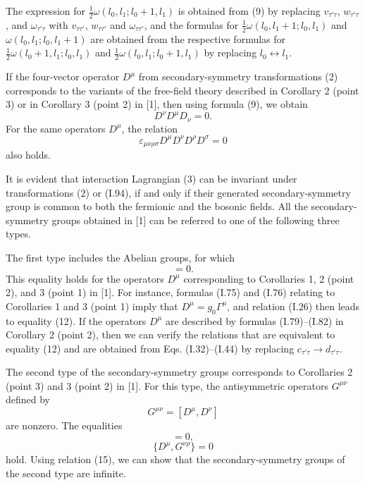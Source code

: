\documentclass[a4paper,12pt]{article}
\begin{document}
The expression for $\frac{1}{2} \omega (l_{0},l_{1};l_{0}+1,l_{1})$ is obtained
from (9) by replacing $v_{\tau' \tau}$, $w_{\tau' \tau}$, and 
$\omega_{\tau' \tau}$ with $v_{\tau \tau'}$, $w_{\tau \tau'}$ and 
$\omega_{\tau \tau'}$, and the formulas for $\frac{1}{2} 
\omega (l_{0},l_{1}+1;l_{0},l_{1})$ and $\omega (l_{0},l_{1};l_{0},l_{1}+1)$ 
are obtained from the respective formulas for $\frac{1}{2} 
\omega (l_{0}+1,l_{1};l_{0},l_{1})$ and $\frac{1}{2} 
\omega (l_{0},l_{1};l_{0}+1,l_{1})$ by replacing $l_{0} \leftrightarrow l_{1}$. 

If the four-vector operator $D^{\mu}$ from secondary-symmetry transformations
(2) corresponds to the variants of the free-field theory described in Corollary
2 (point 3) or in Corollary 3 (point 2) in [1], then using formula (9), we
obtain  
\begin{equation}
D^{\nu}D^{\mu}D_{\nu}=0.
\end{equation}
For the same operators $D^{\mu}$, the relation 
\begin{equation}
\varepsilon_{\mu\nu\rho\sigma}D^{\mu}D^{\nu}D^{\rho}D^{\sigma}=0
\end{equation}
also holds.

It is evident that interaction Lagrangian (3) can be invariant under
transformations (2) or (I.94), if and only if their generated 
secondary-symmetry group is common to both the fermionic and the bosonic 
fields. All the secondary-symmetry groups obtained in [1] can be referred to 
one of the following three types.

The first type includes the Abelian groups, for which
\begin{equation}
[D^{\mu}, D^{\nu}]=0.
\end{equation}
This equality holds for the operators $D^{\mu}$ corresponding to Corollaries 1,
2 (point 2), and 3 (point 1) in [1]. For instance, formulas (I.75) and (I.76)
relating to Corollaries 1 and 3 (point 1) imply that $D^{\mu} = 
g_{0}\Gamma^{\mu}$, and relation (I.26) then leads to equality (12). If the
operators $D^{\mu}$ are described by formulas (I.79)--(I.82) in Corollary 2
(point 2), then we can verify the relations that are equivalent to equality
(12) and are obtained from Eqs. (I.32)--(I.44) by replacing $c_{\tau' \tau} 
\rightarrow d_{\tau' \tau}$.

The second type of the secondary-symmetry groups corresponds to Corollaries 2
(point 3) and 3 (point 2) in [1]. For this type, the antisymmetric operators
$G^{\mu\nu}$ defined by
\begin{equation}
G^{\mu\nu} = [D^{\mu}, D^{\nu}]
\end{equation}
are nonzero. The equalities
\begin{equation}
[G^{\mu\nu}, G^{\rho\sigma}] = 0,
\end{equation}
\begin{equation}
\{ D^{\mu}, G^{\nu\rho} \} = 0
\end{equation}
hold. Using relation (15), we can show that the secondary-symmetry groups of 
the second type are infinite.
\end{document}

